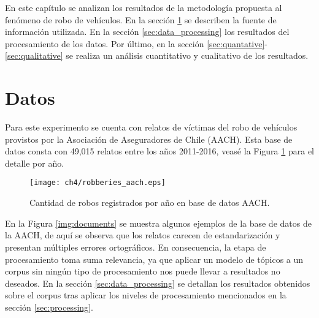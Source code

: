 En este capítulo se analizan los resultados de la metodología propuesta al fenómeno de robo de vehículos. En la sección \ref{sec:data} se describen la fuente de información utilizada. En la sección \ref{sec:data_processing} los resultados del procesamiento de los datos. Por último, en la sección \ref{sec:quantative}-\ref{sec:qualitative} se realiza un análisis cuantitativo y cualitativo de los resultados.

\section{Datos}
\label{sec:data}

Para este experimento se cuenta con relatos de víctimas del robo de vehículos provistos por la Asociación de Aseguradores de Chile (AACH). Esta base de datos consta con 49,015 relatos entre los años 2011-2016, veasé la Figura \ref{img:robberies_aach} para el detalle por año.

\begin{figure}
\texttt{[image: ch4/robberies\_aach.eps]}
\caption{Cantidad de robos registrados por año en base de datos AACH.}
\label{img:robberies_aach}
\end{figure}

En la Figura \ref{img:documents} se muestra algunos ejemplos de la base de datos de la AACH, de aquí se observa que los relatos carecen de estandarización y presentan múltiples errores ortográficos. En consecuencia, la etapa de procesamiento toma suma relevancia, ya que aplicar un modelo de tópicos a un corpus sin ningún tipo de procesamiento nos puede llevar a resultados no deseados. En la sección \ref{sec:data_processing} se detallan los resultados obtenidos sobre el corpus tras aplicar los niveles de procesamiento mencionados en la sección \ref{sec:processing}.

